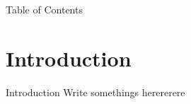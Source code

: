 \begin{frame}[t]{Table of Contents}
\tableofcontents
\end{frame}





\section{Introduction}

\begin{frame}[t]{Introduction}
Write somethings herererere
\end{frame}